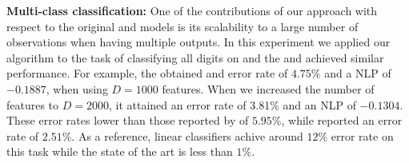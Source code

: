 \textbf{Multi-class classification:} One of the contributions of our approach with respect 
to the original \egp and \ugp models is its scalability to a large number of observations 
when having multiple outputs. In this experiment we applied our algorithm to the task
of classifying all digits on \mnist and 
the \eks and \uks achieved similar performance. For 
example, the \eks obtained and error rate of $ 4.75\%$ and 
a NLP of $-0.1887$, when using $D=1000$ features. When we increased the number 
of features to 	$D=2000$, it attained an error rate of 3.81\% and an NLP of $-0.1304$.
These error rates  lower than those reported by  \citet{gal-et-al-nips-2014} of $5.95\%$, 
while  \citet{dezfouli-bonilla-nips-2015} reported an error 
rate of $2.51\%$. As a reference, linear classifiers achive around $12\%$ error rate on this 
task while the state of the art is less than $1\%$. 

 








